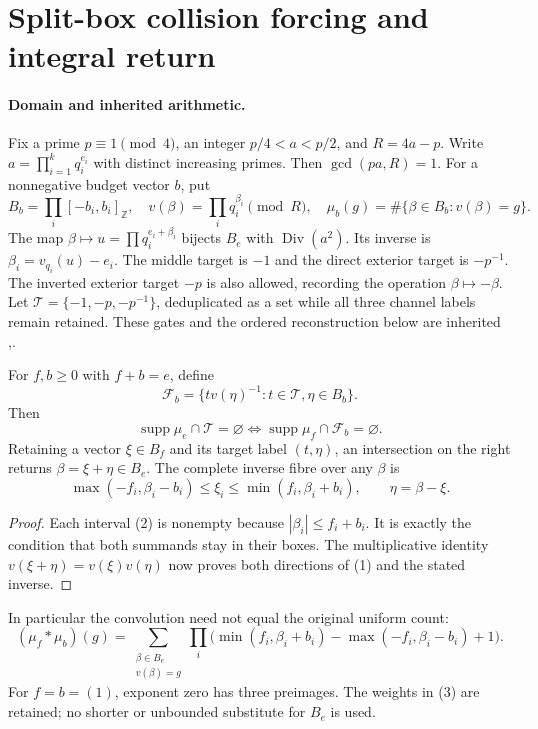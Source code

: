 \section{Split-box collision forcing and integral return}
\paragraph{Domain and inherited arithmetic.}
Fix a prime $p\equiv1\pmod4$, an integer $p/4<a<p/2$, and
$R=4a-p$. Write $a=\prod_{i=1}^kq_i^{e_i}$ with distinct increasing primes.
Then $\gcd(pa,R)=1$. For a nonnegative budget vector $b$, put
\[
 B_b=\prod_i[-b_i,b_i]_{\mathbb Z},\quad
 v(\beta)=\prod_iq_i^{\beta_i}\pmod R,\quad
 \mu_b(g)=\#\{\beta\in B_b:v(\beta)=g\}.
\]
The map $\beta\mapsto u=\prod q_i^{e_i+\beta_i}$ bijects $B_e$ with
$\operatorname{Div}(a^2)$. Its inverse is $\beta_i=v_{q_i}(u)-e_i$.
The middle target is $-1$ and the direct exterior target is $-p^{-1}$.
The inverted exterior target $-p$ is also allowed, recording the operation
$\beta\mapsto-\beta$. Let $\mathcal T=\{-1,-p,-p^{-1}\}$, deduplicated
as a set while all three channel labels remain retained.
These gates and the ordered reconstruction below are inherited
\cite[\S2, Propositions 2.2 and 2.6]{ET},\cite{Prior}.

\begin{theorem}
For $f,b\ge0$ with $f+b=e$, define
\[
 \mathcal F_b=\{t v(\eta)^{-1}:t\in\mathcal T,\eta\in B_b\}.
\]
Then
\[
 \operatorname{supp}\mu_e\cap\mathcal T=\varnothing
 \iff \operatorname{supp}\mu_f\cap\mathcal F_b=\varnothing.
 \tag{1}
\]
Retaining a vector $\xi\in B_f$ and its target label $(t,\eta)$, an
intersection on the right returns $\beta=\xi+\eta\in B_e$.
The complete inverse fibre over any $\beta$ is
\[
 \max(-f_i,\beta_i-b_i)\le\xi_i\le\min(f_i,\beta_i+b_i),
 \qquad\eta=\beta-\xi.\tag{2}
\]
\end{theorem}
\begin{proof}
Each interval (2) is nonempty because $|\beta_i|\le f_i+b_i$.
It is exactly the condition that both summands stay in their boxes.
The multiplicative identity $v(\xi+\eta)=v(\xi)v(\eta)$ now proves
both directions of (1) and the stated inverse.
\end{proof}
In particular the convolution need not equal the original uniform count:
\[
 (\mu_f*\mu_b)(g)=\sum_{\substack{\beta\in B_e\\v(\beta)=g}}
 \prod_i\bigl(\min(f_i,\beta_i+b_i)-\max(-f_i,\beta_i-b_i)+1\bigr).
 \tag{3}
\]
For $f=b=(1)$, exponent zero has three preimages. The weights in (3)
are retained; no shorter or unbounded substitute for $B_e$ is used.

